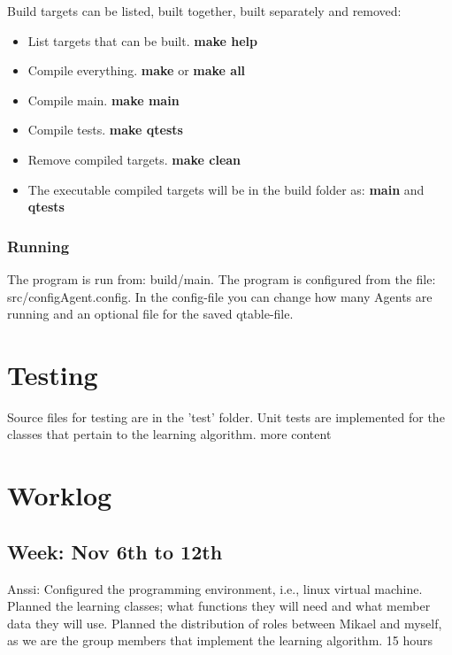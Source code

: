 \documentclass{article}
\begin{document}
Build targets can be listed, built together, built separately and removed:

\begin{itemize}
  \item List targets that can be built. \textbf{make help}

 \item Compile everything. \textbf{make} or \textbf{make all}

 \item Compile main. \textbf{make main}

 \item Compile tests. \textbf{make qtests}

 \item Remove compiled targets. \textbf{make clean}

 \item The executable compiled targets will be in the build folder as:
  \textbf{main} and \textbf{qtests}
\end{itemize}

\subsubsection{Running}

The program is run from: build/main.
The program is configured from the file: src/configAgent.config.
In the config-file you can change how many Agents are running and
an optional file for the saved qtable-file.

\section{Testing}

Source files for testing are in the 'test' folder. Unit tests
are implemented for
the classes that pertain to the learning algorithm. more content


\section{Worklog}

\subsection{Week: Nov 6th to 12th}

Anssi:
Configured the programming environment, i.e., linux virtual machine.
Planned the learning classes; what functions they will need and what
member data they will use. Planned the distribution of roles between
Mikael and myself, as we are the group members that implement the learning
algorithm.
15 hours
\end{document}

